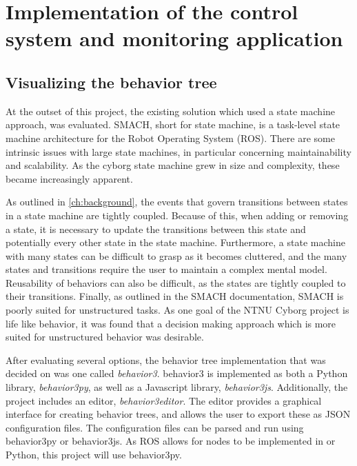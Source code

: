\documentclass[\rootfolder/main.tex]{subfiles}
\begin{document}
\chapter{Implementation of the control system and monitoring application} %

\label{ch:controlsystem} %

\section{Visualizing the behavior tree}

At the outset of this project, the existing solution which used a state machine approach, was evaluated.
SMACH, short for state machine, is a task-level state machine architecture for the Robot Operating System (ROS).
There are some intrinsic issues with large state machines, in particular concerning maintainability and scalability.
As the cyborg state machine grew in size and complexity, these became increasingly apparent.

As outlined in \cref{ch:background}, the events that govern transitions between states in a state machine are tightly coupled.
Because of this, when adding or removing a state, it is necessary to update the transitions between this state and potentially every other state in the state machine.
Furthermore, a state machine with many states can be difficult to grasp as it becomes cluttered, and the many states and transitions require the user to maintain a complex mental model.
Reusability of behaviors can also be difficult, as the states are tightly coupled to their transitions.
Finally, as outlined in the SMACH documentation, SMACH is poorly suited for unstructured tasks.
As one goal of the NTNU Cyborg project is life like behavior, it was found that a decision making approach which is more suited for unstructured behavior was desirable.

After evaluating several options, the behavior tree implementation that was decided on was one called \emph{behavior3}.
behavior3 is implemented as both a Python library, \emph{behavior3py}, as well as a Javascript library, \emph{behavior3js}.
Additionally, the project includes an editor, \emph{behavior3editor}.
The editor provides a graphical interface for creating behavior trees, and allows the user to export these as JSON configuration files.
The configuration files can be parsed and run using behavior3py or behavior3js.
As ROS allows for nodes to be implemented in \CC or Python, this project will use behavior3py.
\end{document}
